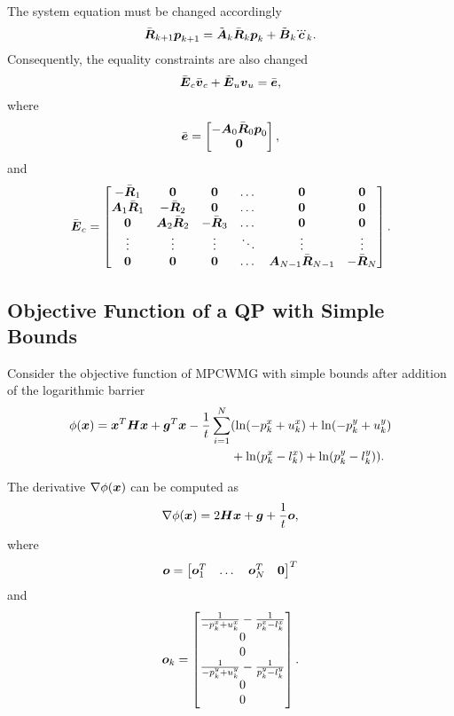 The system equation must be changed accordingly 
$$
\bar{\mbm{R}}_{k+1}\mbm{p}_{k+1}
= \tilde{\mbm{A}}_k \bar{\mbm{R}}_k\mbm{p}_{k} + \tilde{\mbm{B}}_k \dddot{\mbm{c}}_{k}.
$$
Consequently, the equality constraints are also changed
$$
\bar{\mbox{\boldmath $E$}}_c\bar{\mbox{\boldmath $v$}}_c + \tilde{\mbox{\boldmath $E$}}_u\mbox{\boldmath $v$}_u = \bar{\mbox{\boldmath $e$}},
$$
where
$$
\bar{\mbox{\boldmath $e$}} = 
\begin{bmatrix}
    -\mbox{\boldmath $A$}_0\bar{\mbox{\boldmath $R$}}_0\mbox{\boldmath $p$}_0 \\
    \mbox{\boldmath $0$}
\end{bmatrix},
$$
and
$$
\bar{\mbox{\boldmath $E$}}_c =
  \begin{bmatrix} 
    -\bar{\mbox{\boldmath $R$}}_1    &  \mbox{\boldmath $0$}            &  \mbox{\boldmath $0$}         & \dots  & \mbox{\boldmath $0$}               & \mbox{\boldmath $0$}  \\
     \mbox{\boldmath $A$}_1\bar{\mbox{\boldmath $R$}}_1 & -\bar{\mbox{\boldmath $R$}}_2    &  \mbox{\boldmath $0$}         & \dots  & \mbox{\boldmath $0$}               & \mbox{\boldmath $0$}  \\
     \mbox{\boldmath $0$}            &  \mbox{\boldmath $A$}_2\bar{\mbox{\boldmath $R$}}_2 & -\bar{\mbox{\boldmath $R$}}_3 & \dots  & \mbox{\boldmath $0$}               & \mbox{\boldmath $0$}  \\
     \vdots             &  \vdots             &  \vdots          & \ddots & \vdots                & \vdots   \\
     \mbox{\boldmath $0$}            &  \mbox{\boldmath $0$}            &  \mbox{\boldmath $0$}         & \dots  & \mbox{\boldmath $A$}_{N-1}\bar{\mbox{\boldmath $R$}}_{N-1} & -\bar{\mbox{\boldmath $R$}}_N \\
  \end{bmatrix}.
$$


\subsection{Objective Function of a QP with Simple Bounds}
Consider the objective function of \ac{MPCWMG} with simple bounds after addition 
of the logarithmic barrier
\begin{align*}
\phi(\mbox{\boldmath $x$}) 
= 
    \mbox{\boldmath $x$}^T \mbox{\boldmath $H$} \mbox{\boldmath $x$} + \mbox{\boldmath $g$}^T\mbox{\boldmath $x$}
    -\frac{1}{t} \sum^{N}_{i=1} 
    &(
        \ln (-p_k^x + u_k^x)
        +
        \ln (-p_k^y + u_k^y)\\
    &    +
        \ln (p_k^x - l_k^x)
        +
        \ln (p_k^y - l_k^y)
    ).
\end{align*}

The derivative $\nabla\phi(\mbox{\boldmath $x$})$ can be computed as
$$
\nabla\phi(\mbox{\boldmath $x$}) = 2\mbox{\boldmath $H$}\mbox{\boldmath $x$} + \mbox{\boldmath $g$} + \frac{1}{t} \mbox{\boldmath $o$},
$$
where
$$
\mbox{\boldmath $o$} = 
\begin{bmatrix}
    \mbox{\boldmath $o$}^T_1 & \dots & \mbox{\boldmath $o$}^T_N & \mbox{\boldmath $0$} \\
\end{bmatrix}^T
$$
and
$$
\mbox{\boldmath $o$}_k = 
\begin{bmatrix}
    \frac{1}{-p_k^x + u_k^x} - \frac{1}{p_k^x - l_k^x}\\
    0\\
    0\\
    \frac{1}{-p_k^y + u_k^y} - \frac{1}{p_k^y - l_k^y}\\
    0\\
    0
\end{bmatrix}.
$$

